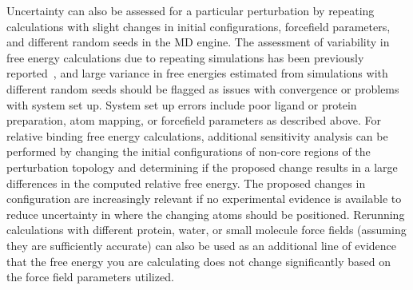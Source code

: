 \documentclass[9pt,bestpractices]{livecoms}
\begin{document}
Uncertainty can also be assessed for a particular perturbation by repeating calculations with slight changes in initial configurations, forcefield parameters, and different random seeds in the MD engine. 
The assessment of variability in free energy calculations due to repeating simulations has been previously reported~\cite{aldeghi2019accurate}, and large variance in free energies estimated from simulations with different random seeds should be flagged as issues with convergence or problems with system set up. 
System set up errors include poor ligand or protein preparation, atom mapping, or forcefield parameters as described above.
For relative binding free energy calculations, additional sensitivity analysis can be performed by changing the initial configurations of non-core regions of the perturbation topology and determining if the proposed change results in a large differences in the computed relative free energy.
The proposed changes in configuration are increasingly relevant if no experimental evidence is available to reduce uncertainty in where the changing atoms should be positioned.
Rerunning calculations with different protein, water, or small molecule force fields (assuming they are sufficiently accurate) can also be used as an additional line of evidence that the free energy you are calculating does not change significantly based on the force field parameters utilized.
\end{document}
